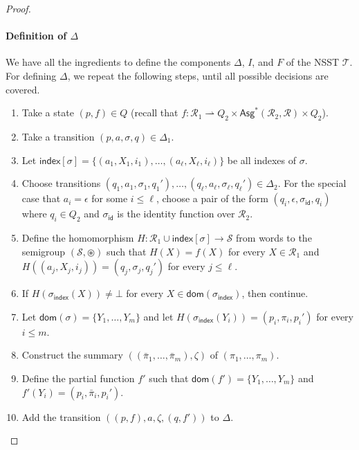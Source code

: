 \documentclass[
a4paper
]{article}
\theoremstyle{plain}
\theoremstyle{definition}
\theoremstyle{remark}
\newcommand{\dom}{\operatorname{dom}}
\newcommand{\pmap}{\rightharpoonup}
\newcommand{\Reg}{\mathcal{R}}
\newcommand{\Asgs}{\operatorname{Asg}^*}
\newcommand{\nsst}{\mathcal{T}}
\newcommand{\indx}{\operatorname{index}}
\newcommand{\indxsigma}{\sigma_{\indx}}
\renewcommand{\operatorname}[1]{\textsf{#1}}
\begin{document}
\begin{proof}
\paragraph{Definition of $\Delta$} We have all the ingredients to define the components $\Delta$, $I$, and $F$ of the NSST $\nsst$. For defining $\Delta$, we repeat the following steps, until all possible decisions are covered.
\begin{enumerate}
	\item Take a state $(p, f) \in Q$ (recall that $f: \Reg_1 \pmap Q_2 \times \Asgs(\Reg_2, \Reg) \times Q_2$).
	\item Take a transition $(p, a, \sigma, q) \in \Delta_1$. 
	\item Let $\indx[\sigma] = \{(a_1, X_1, i_1), \ldots, (a_\ell, X_\ell, i_\ell)\}$ be all indexes of $\sigma$.
	\item Choose transitions $(q_1, a_1, \sigma_1, q_1'), \ldots, (q_\ell, a_\ell, \sigma_\ell, q_\ell') \in \Delta_2$.
	For the special case that $a_i = \epsilon$ for some $i \leq \ell$, choose a pair of the form $(q_i, \epsilon, \sigma_{\operatorname{id}}, q_i)$ where $q_i \in Q_2$ and $\sigma_{\operatorname{id}}$ is the identity function over $\Reg_2$.
	\item Define the homomorphism $H: \Reg_1 \cup \indx[\sigma] \to \mathcal{S}$ from words to the semigroup $(\mathcal{S}, \circledast)$ such that
	 $H(X) = f(X)$ for every $X \in \Reg_1$ and $H((a_j, X_j, i_j)) = (q_j, \sigma_j, q_j')$ for every $j \leq \ell$. 
	\item If $H(\indxsigma(X)) \neq \bot$ for every $X \in \dom(\indxsigma)$, then continue.
	\item Let $\dom(\sigma) = \{Y_1, \ldots, Y_m\}$ and let $H(\indxsigma(Y_i)) = (p_i, \pi_i, p_i')$ for every $i \leq m$. 
	\item Construct the summary $((\bar{\pi}_1, \ldots, \bar{\pi}_m), \zeta)$ of $(\pi_1, \ldots, \pi_m)$.
	\item Define the partial function $f'$ such that $\dom(f') =\{Y_1, \ldots, Y_m\}$ and $f'(Y_i) = (p_i, \bar{\pi}_i, p_i')$.
	\item Add the transition $((p,f), a, \zeta, (q, f'))$ to $\Delta$.  
\end{enumerate}

\end{proof}
\end{document}
